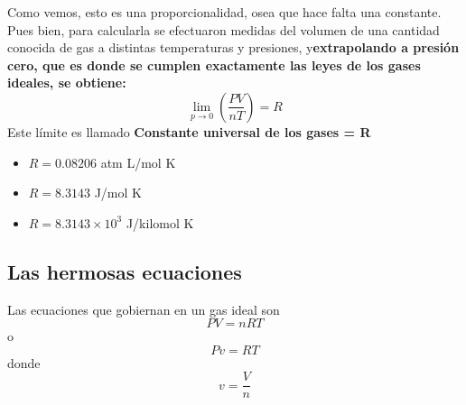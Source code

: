 \documentclass[12pt,twocolumn,a4paper]{report}
\begin{document}
Como vemos, esto es una proporcionalidad, osea que hace falta una constante. Pues bien, para calcularla se efectuaron medidas del volumen de una cantidad conocida de gas a distintas temperaturas y presiones, y\textbf{extrapolando a presión cero, que es donde se cumplen exactamente las leyes de los gases ideales, se obtiene:}
\begin{equation*}
\displaystyle\lim_{p\to 0}(\dfrac{PV}{nT}) = R
\end{equation*}
Este límite es llamado \textbf{Constante universal de los gases = R}
\begin{itemize}
\setlength\itemsep{0.001cm}
\item {$R = 0.08206$ atm L/mol K}
\item {$R = 8.3143$ J/mol K}
\item {$R = 8.3143 \times 10^3$ J/kilomol K}
\end{itemize}

\subsection*{Las hermosas ecuaciones}
Las ecuaciones que gobiernan en un gas ideal son 
\begin{equation*}
PV = nRT
\end{equation*}
o
\begin{equation*}
Pv = RT
\end{equation*}
donde
\begin{equation*}
v = \dfrac{V}{n}
\end{equation*}
\end{document}
